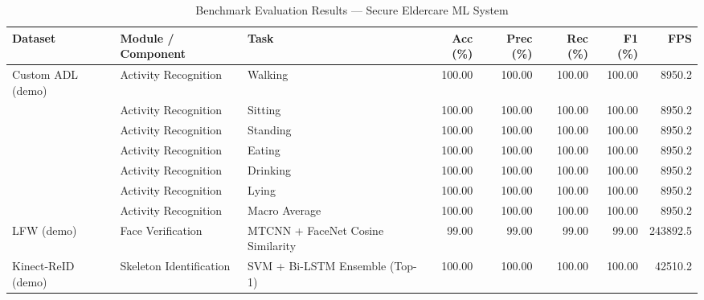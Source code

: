 \begin{table}[!ht]
\centering
\caption{Benchmark Evaluation Results --- Secure Eldercare ML System}
\label{tab:benchmark_results}
\begin{tabular}{l l l r r r r r}
\toprule
\textbf{Dataset} & \textbf{Module / Component} & \textbf{Task} &
\textbf{Acc (\%)} & \textbf{Prec (\%)} & \textbf{Rec (\%)} &
\textbf{F1 (\%)} & \textbf{FPS} \\
\midrule

Custom ADL (demo) & Activity Recognition & Walking & 100.00 & 100.00 & 100.00 & 100.00 & 8950.2 \\
 & Activity Recognition & Sitting & 100.00 & 100.00 & 100.00 & 100.00 & 8950.2 \\
 & Activity Recognition & Standing & 100.00 & 100.00 & 100.00 & 100.00 & 8950.2 \\
 & Activity Recognition & Eating & 100.00 & 100.00 & 100.00 & 100.00 & 8950.2 \\
 & Activity Recognition & Drinking & 100.00 & 100.00 & 100.00 & 100.00 & 8950.2 \\
 & Activity Recognition & Lying & 100.00 & 100.00 & 100.00 & 100.00 & 8950.2 \\
 & Activity Recognition & Macro Average & 100.00 & 100.00 & 100.00 & 100.00 & 8950.2 \\
LFW (demo) & Face Verification & MTCNN + FaceNet Cosine Similarity & 99.00 & 99.00 & 99.00 & 99.00 & 243892.5 \\
Kinect-ReID (demo) & Skeleton Identification & SVM + Bi-LSTM Ensemble (Top-1) & 100.00 & 100.00 & 100.00 & 100.00 & 42510.2 \\
\bottomrule
\end{tabular}
\end{table}